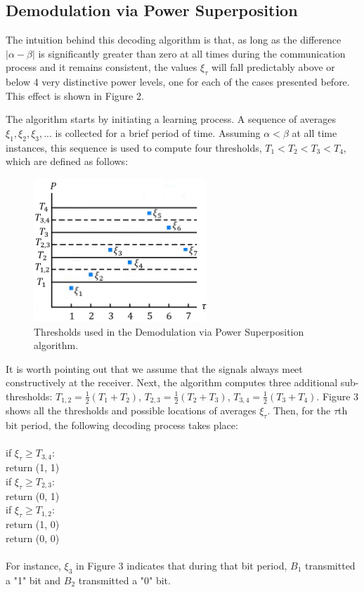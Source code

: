 \documentclass[letterpaper, 10 pt, conference]{IEEEconf}
\begin{document}
\subsection{Demodulation via Power Superposition} The intuition behind this decoding algorithm is that, as long as the difference $|\alpha - \beta|$ is significantly greater than zero at all times during the communication process and it remains consistent, the values $\xi_{\tau}$ will fall predictably above or below 4 very distinctive power levels, one for each of the cases presented before. This effect is shown in Figure 2.

The algorithm starts by initiating a learning process. A sequence of averages $\xi_{1}, \xi_{2}, \xi_{3},...$ is collected for a brief period of time. Assuming $\alpha<\beta$ at all time instances, this sequence is used to compute four thresholds, $T_1<T_2<T_3<T_4$, which are defined as follows:

\begin{figure}[h!]
  \centerline{\includegraphics[width=65mm,scale=0.50]{Figure_3.png}}
  \caption{Thresholds used in the Demodulation via Power Superposition algorithm.}
\end{figure}

It is worth pointing out that we assume that the signals always meet constructively at the receiver. Next, the algorithm computes three additional sub-thresholds: $T_{1,2}=\frac{1}{2}(T_1 +T_2)$, $T_{2,3}=\frac{1}{2}(T_2 +T_3)$, $T_{3,4}=\frac{1}{2}(T_3 +T_4)$. Figure 3 shows all the thresholds and possible locations of averages $\xi_{\tau}$. Then, for the $\tau$th bit period, the following decoding process takes place:\\\\if $\xi_\tau \geq T_{3,4}:$\\
\hphantom{1cm}return (1, 1)\\
if $\xi_\tau \geq T_{2,3}$:\\
\hphantom{1cm}return (0, 1)\\
if $\xi_\tau \geq T_{1,2}$:\\
\hphantom{1cm}return (1, 0)\\
return (0, 0)\\\\For instance, $\xi_3$ in Figure 3 indicates that during that bit period, $B_1$ transmitted a "1" bit and $B_2$ transmitted a "0" bit.
\end{document}
